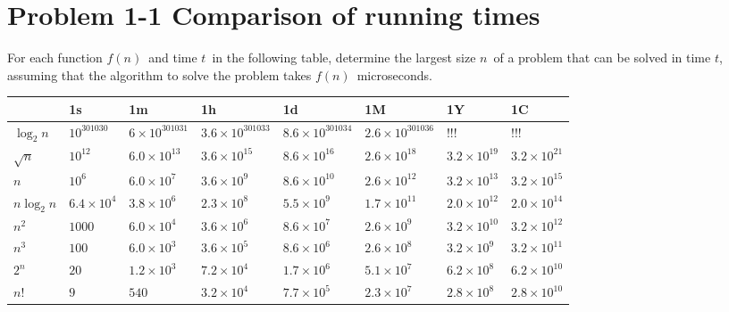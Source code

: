 \documentclass{article}
\newcommand{\?}{\stackrel{?}{=}}
\newcommand\Ans[2][]{%
   \leavevmode\noindent
   {
       \begin{mdframed}[backgroundcolor=blue!10]
       #2
       \end{mdframed}
   }
}
\begin{document}
\section{Problem 1-1 Comparison of running times}
For each function $f(n)$\ and time $t$\ in the following table, determine the largest size $n$\ of a problem that can be solved in time $t$, assuming that the algorithm to solve the problem takes $f(n)$\ microseconds.
\Ans{
	\begin{tabular}{l|l|l|l|l|l|l|l}
		~      & 1s         & 1m & 1h & 1d & 1M & 1Y & 1C \\
		\hline
	$\log_2n$  & $10^{301030}$ & $6\times 10^{301031}$ & $3.6\times 10^{301033}$ & $8.6\times 10^{301034}$ & $2.6\times 10^{301036}$ & !!! & !!!   \\
	$\sqrt{n}$ & $10^{12}$  & $6.0\times 10^{13}$   & $3.6\times 10^{15}$   & $8.6\times 10^{16}$ & $2.6\times 10^{18}$   & $3.2\times 10^{19}$ & $3.2\times 10^{21}$\\
	$n$        & $10^6$     & $6.0\times 10^7$ & $3.6\times 10^9$ & $8.6\times 10^{10}$ & $2.6\times 10^{12}$ & $3.2\times 10^{13}$ & $3.2\times 10^{15}$ \\
	$n\log_2n$ & $6.4\times 10^4$& $3.8\times 10^6$ & $2.3\times 10^8$ & $5.5\times 10^9$ & $1.7\times 10^{11}$ & $2.0\times 10^{12}$ & $2.0\times 10^{14}$ \\
	$n^2$      & $1000$     & $6.0\times 10^4$ & $3.6\times 10^6$ & $8.6\times 10^7$ & $2.6\times 10^9$ & $3.2\times 10^{10}$ & $3.2\times 10^{12}$ \\
	$n^3$      & $100$      & $6.0\times 10^3$ & $3.6\times 10^5$ & $8.6\times 10^6$ & $2.6\times 10^8$ & $3.2\times 10^9$ & $3.2\times 10^{11}$ \\
	$2^n$      & $20$       & $1.2\times 10^3$ & $7.2\times 10^4$ & $1.7\times 10^6$ & $5.1\times 10^7$ & $6.2\times 10^8$ & $6.2\times 10^{10}$ \\
	$n!$       & $9$        & $540$ & $3.2\times 10^4$ & $7.7\times 10^5$ & $2.3\times 10^7$ & $2.8\times 10^8$ & $2.8\times 10^{10}$
	\end{tabular} 
}
\newpage
\end{document}
